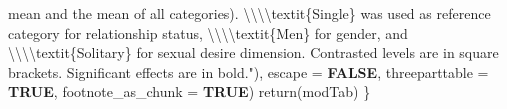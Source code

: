 \documentclass[
  bookmarksnumbered]{article}
\newenvironment{Shaded}{\begin{snugshade}}{\end{snugshade}}
\newcommand{\AttributeTok}[1]{\textcolor[rgb]{0.80,0.80,0.80}{#1}}
\newcommand{\ConstantTok}[1]{\textcolor[rgb]{0.86,0.64,0.64}{\textbf{#1}}}
\newcommand{\FunctionTok}[1]{\textcolor[rgb]{0.94,0.94,0.56}{#1}}
\newcommand{\NormalTok}[1]{\textcolor[rgb]{0.80,0.80,0.80}{#1}}
\newcommand{\SpecialCharTok}[1]{\textcolor[rgb]{0.86,0.64,0.64}{#1}}
\newcommand{\StringTok}[1]{\textcolor[rgb]{0.80,0.58,0.58}{#1}}
\begin{document}
\begin{Shaded}
\begin{Highlighting}[]
\StringTok{                              mean and the mean of all categories).}
\StringTok{                              }\SpecialCharTok{\textbackslash{}\textbackslash{}\textbackslash{}\textbackslash{}}\StringTok{textit\{Single\} was used as reference category}
\StringTok{                              for relationship status, }\SpecialCharTok{\textbackslash{}\textbackslash{}\textbackslash{}\textbackslash{}}\StringTok{textit\{Men\} for gender, }
\StringTok{                              and }\SpecialCharTok{\textbackslash{}\textbackslash{}\textbackslash{}\textbackslash{}}\StringTok{textit\{Solitary\} for  sexual desire dimension.}
\StringTok{                              Contrasted levels are in square brackets.}
\StringTok{                              Significant effects are in bold."}\NormalTok{),}
             \AttributeTok{escape =} \ConstantTok{FALSE}\NormalTok{,}
             \AttributeTok{threeparttable =} \ConstantTok{TRUE}\NormalTok{,}
             \AttributeTok{footnote\_as\_chunk =} \ConstantTok{TRUE}\NormalTok{)}
    \FunctionTok{return}\NormalTok{(modTab)}
\NormalTok{\}}


\end{Highlighting}
\end{Shaded}
\end{document}
